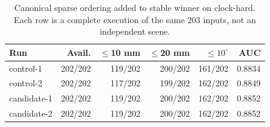 \begin{table}[t]\centering\scriptsize
\caption{Canonical sparse ordering added to stable winner on clock-hard. Each row is a complete execution of the same 203 inputs, not an independent scene.}
\label{tab:bt-order}
\begin{tabular}{lrrrrr}\toprule
Run & Avail. & $\leq$10 mm & $\leq$20 mm & $\leq10^\circ$ & AUC\\\midrule
control-1 & 202/202 & 119/202 & 200/202 & 161/202 & 0.8834\\
control-2 & 202/202 & 117/202 & 199/202 & 162/202 & 0.8849\\
candidate-1 & 202/202 & 119/202 & 200/202 & 162/202 & 0.8852\\
candidate-2 & 202/202 & 119/202 & 200/202 & 162/202 & 0.8852\\
\bottomrule\end{tabular}\end{table}
